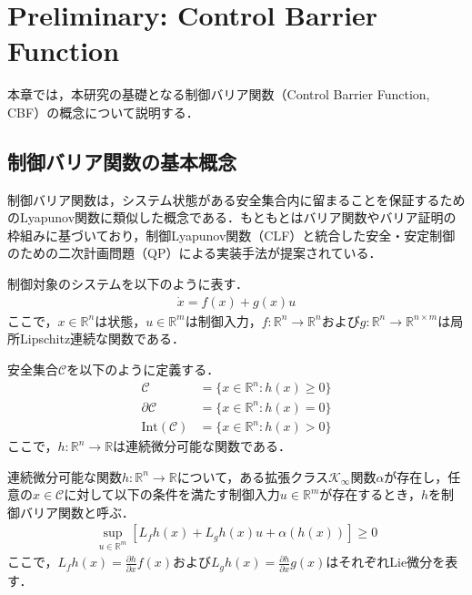 \section{Preliminary: Control Barrier Function}

本章では，本研究の基礎となる制御バリア関数（Control Barrier Function, CBF）の概念について説明する．

\subsection{制御バリア関数の基本概念}

制御バリア関数は，システム状態がある安全集合内に留まることを保証するためのLyapunov関数に類似した概念である．もともとはバリア関数やバリア証明の枠組みに基づいており，制御Lyapunov関数（CLF）と統合した安全・安定制御のための二次計画問題（QP）による実装手法が提案されている\cite{Ames2017}．

制御対象のシステムを以下のように表す．
\begin{equation}
\begin{aligned}
\dot{x} = f(x) + g(x)u
\label{eq:system}
\end{aligned}
\end{equation}
ここで，$x \in \mathbb{R}^n$は状態，$u \in \mathbb{R}^m$は制御入力，$f: \mathbb{R}^n \rightarrow \mathbb{R}^n$および$g: \mathbb{R}^n \rightarrow \mathbb{R}^{n \times m}$は局所Lipschitz連続な関数である．

安全集合$\mathcal{C}$を以下のように定義する．
\begin{equation}
\begin{aligned}
\mathcal{C} &= \{x \in \mathbb{R}^n : h(x) \geq 0\} \\
\partial\mathcal{C} &= \{x \in \mathbb{R}^n : h(x) = 0\} \\
\text{Int}(\mathcal{C}) &= \{x \in \mathbb{R}^n : h(x) > 0\}
\label{eq:safe_set}
\end{aligned}
\end{equation}
ここで，$h: \mathbb{R}^n \rightarrow \mathbb{R}$は連続微分可能な関数である．

\begin{definition}[制御バリア関数]
連続微分可能な関数$h: \mathbb{R}^n \rightarrow \mathbb{R}$について，ある拡張クラス$\mathcal{K}_{\infty}$関数$\alpha$が存在し，任意の$x \in \mathcal{C}$に対して以下の条件を満たす制御入力$u \in \mathbb{R}^m$が存在するとき，$h$を制御バリア関数と呼ぶ．
\begin{equation}
\begin{aligned}
\sup_{u \in \mathbb{R}^m} [L_f h(x) + L_g h(x)u + \alpha(h(x))] \geq 0
\label{eq:cbf_condition}
\end{aligned}
\end{equation}
ここで，$L_f h(x) = \frac{\partial h}{\partial x}f(x)$および$L_g h(x) = \frac{\partial h}{\partial x}g(x)$はそれぞれLie微分を表す．
\end{definition}

